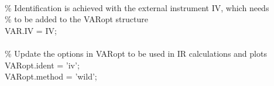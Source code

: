 \hspace{1mm}\hspace{5mm} \hspace{5mm} \hspace{5mm}  \\ 
\hspace{1mm}\hspace{5mm} \hspace{5mm} \hspace{5mm} \textcolor{matlabgreen}{\% Identification is achieved with the external instrument IV, which needs }\\ 
\hspace{1mm}\hspace{5mm} \hspace{5mm} \hspace{5mm} \textcolor{matlabgreen}{\% to be added to the VARopt structure }\\ 
\hspace{1mm}\hspace{5mm} \hspace{5mm} \hspace{5mm} VAR.IV = IV; \\ 
\hspace{1mm}\hspace{5mm} \hspace{5mm} \hspace{5mm}  \\ 
\hspace{1mm}\hspace{5mm} \hspace{5mm} \hspace{5mm} \textcolor{matlabgreen}{\% Update the options in VARopt to be used in IR calculations and plots }\\ 
\hspace{1mm}\hspace{5mm} \hspace{5mm} \hspace{5mm} VARopt.ident = \textcolor{matlabpurple}{'iv'}; \\ 
\hspace{1mm}\hspace{5mm} \hspace{5mm} \hspace{5mm} VARopt.method = \textcolor{matlabpurple}{'wild'}; \\ 
\hspace{1mm}\hspace{5mm} \hspace{5mm} \hspace{5mm}  \\ 
